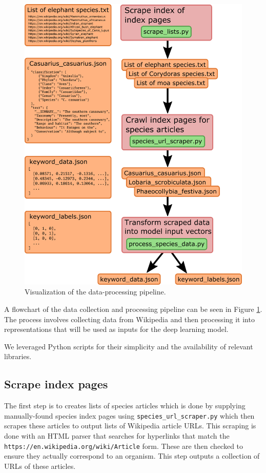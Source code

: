\documentclass[10pt,twocolumn,letterpaper]{article}
\begin{document}
\begin{figure}
  \includegraphics[width=\linewidth]{data.png}
  \caption{Visualization of the data-processing pipeline.}
  \label{fig:data}
\end{figure}

A flowchart of the data collection and processing pipeline can be seen in Figure \ref{fig:data}. The process involves collecting data from Wikipedia and then processing it into representations that will be used as inputs for the deep learning model.

We leveraged Python scripts for their simplicity and the availability of relevant libraries. 

\subsection{Scrape index pages}
The first step is to creates lists of species articles which is done by supplying manually-found species index pages using \texttt{species\_url\_scraper.py} which then scrapes these articles to output lists of Wikipedia article URLs. This scraping is done with an HTML parser that searches for hyperlinks that match the \texttt{https://en.wikipedia.org/wiki/Article} form. These are then checked to ensure they actually correspond to an organism. This step outputs a collection of URLs of these articles.
\end{document}
